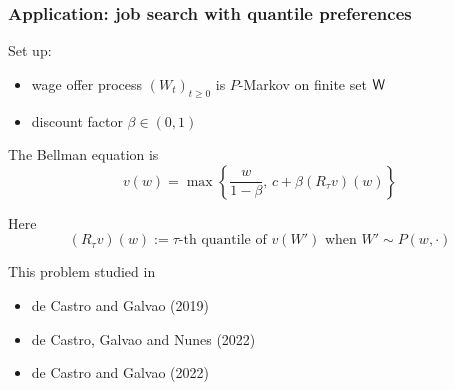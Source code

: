 \documentclass[dvipsnames]{beamer}
\begin{document}
\begin{frame}
    \frametitle{Application: job search with quantile preferences}

    Set up:
        \vspace{0.5em}
    \begin{itemize}
        \item wage offer process $(W_t)_{t \geq 0}$ is $P$-Markov on finite set $\mathsf W$ 
        \vspace{0.5em}
        \item discount factor $\beta \in (0,1)$
    \end{itemize}

        \vspace{0.5em}
        \vspace{0.5em}
    The Bellman equation is
    \begin{equation*}
        v(w) =
        \max
        \left\{
             \frac{w}{1-\beta} , \,   c + \beta (R_\tau v)(w) 
        \right\}
    \end{equation*}

    Here
    \begin{equation*}
        (R_\tau v)(w)
        := \text{$\tau$-th quantile of } 
        v(W') \text{ when } 
        W' \sim P(w, \cdot)
    \end{equation*}

\end{frame}

\begin{frame}
    
    This problem studied in
        \vspace{0.5em}
    \begin{itemize}
        \item de Castro and Galvao (2019)
        \vspace{0.5em}
        \vspace{0.5em}
        \item de Castro, Galvao and Nunes (2022)
        \vspace{0.5em}
        \vspace{0.5em}
        \item de Castro and Galvao (2022)
    \end{itemize}

\end{frame}
\end{document}
